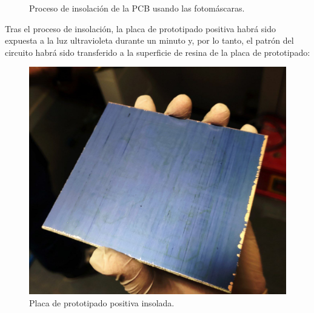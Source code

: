 \begin{enumerate}
    \begin{figure}[H]
    \centering
    \caption{Proceso de insolación de la \ac{PCB} usando las fotomáscaras.}
    \end{figure}
    
    Tras el proceso de insolación, la placa de prototipado positiva habrá sido expuesta a la luz ultravioleta durante un minuto y, por lo tanto, el patrón del circuito habrá sido transferido a la superficie de resina de la placa de prototipado:
    
    \begin{figure}[H]
    \centering 
    \includegraphics[width=0.5\linewidth]{pictures/PCBisolada.jpg}
    \caption{Placa de prototipado positiva insolada.}
    \end{figure}
    

\end{enumerate}
